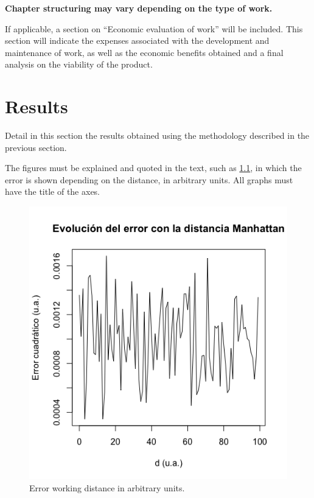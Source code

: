 \documentclass[ENG]{TFUOC}%
\begin{document}
 
\textbf{Chapter structuring may vary depending on the type of work.}  
 
If applicable, a section on “Economic evaluation of work” will be included. This section will indicate the expenses associated with the development and maintenance of work, as well as the economic benefits obtained and a final analysis on the viability of the product.



\chapter{Results}

Detail in this section the results obtained using the methodology described in the previous section.



The figures must be explained and quoted in the text, such as \ref{fig:my_label}, in which the error is shown depending on the distance, in arbitrary units. All graphs must have the title of the axes.

\begin{figure}[!htbp]
    \centering
    \includegraphics[width=7truecm]{Rplotmanh.png}
    \caption{Error working distance in arbitrary units.}
    \label{fig:my_label}
\end{figure}
\end{document}
